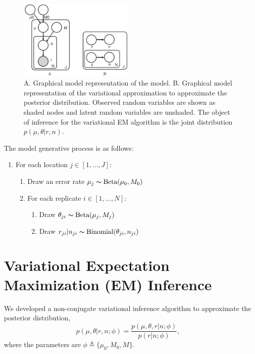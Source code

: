 \documentclass[11pt,reqno]{amsart}
\begin{document}
\begin{figure}[htpb]
\centering
\includegraphics[width=0.5\textwidth]{figs/rvd3_model.png}
\caption{A. Graphical model representation of the model.
B. Graphical model representation of the variational approximation  to approximate the posterior distribution.
Observed random variables are shown as shaded nodes and latent random variables are unshaded.
The object of inference for the variational EM algorithm is the joint distribution $p(\mu, \theta|r, n)$.}
\label{tbl:graphical_model}
\end{figure}
The model generative process is as follows:
\begin{enumerate}[noitemsep]
    \item For each location $j \in [1, \ldots, J]$:
	\begin{enumerate}
		\item Draw an error rate $\mu_j \thicksim \text{Beta}(\mu_0, M_0)$
		\item For each replicate $i \in [1, \ldots, N]$:
		\begin{enumerate}
			\item Draw $\theta_{ji} \thicksim \text{Beta}(\mu_j, M_j)$
			\item Draw $r_{ji} | n_{ji} \thicksim \text{Binomial}(\theta_{ji}, n_{ji})$
		\end{enumerate}
	\end{enumerate}
\end{enumerate}


\section{Variational Expectation Maximization (EM) Inference}
We developed a non-conjugate variational inference algorithm to approximate the posterior distribution,
\begin{equation}
	p(\mu, \theta | r, n; \phi)  = \frac{ p(\mu, \theta, r | n; \phi) } {p ( r | n; \phi)},
\end{equation}
where the parameters are $\phi \triangleq \{\mu_0, M_0, M\}$.
\end{document}
